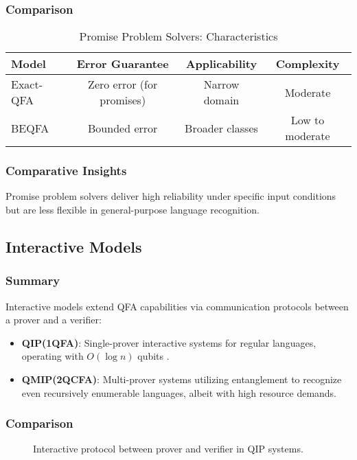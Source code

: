 \subsubsection{Comparison}
\begin{table}[ht]
\centering
\label{tab:promise}
\begin{tabular}{|l|c|c|c|}
\hline
\textbf{Model} & \textbf{Error Guarantee} & \textbf{Applicability} & \textbf{Complexity} \\ \hline
Exact-QFA & Zero error (for promises) & Narrow domain & Moderate \\ \hline
BEQFA    & Bounded error & Broader classes & Low to moderate \\ \hline
\end{tabular}
\caption{Promise Problem Solvers: Characteristics}
\end{table}

\subsubsection{Comparative Insights}
Promise problem solvers deliver high reliability under specific input conditions but are less flexible in general-purpose language recognition.

\subsection*{Interactive Models}

\subsubsection{Summary}
Interactive models extend QFA capabilities via communication protocols between a prover and a verifier:
\begin{itemize}
    \item \textbf{QIP(1QFA)}: Single-prover interactive systems for regular languages, operating with $O(\log n)$ qubits \cite{yakaryilmaz2013verification}.
    \item \textbf{QMIP(2QCFA)}: Multi-prover systems utilizing entanglement to recognize even recursively enumerable languages, albeit with high resource demands.
\end{itemize}

\subsubsection{Comparison}
\begin{figure}[ht]
\centering
{}
\caption{Interactive protocol between prover and verifier in QIP systems.}
\label{fig:interactive}
\end{figure}


